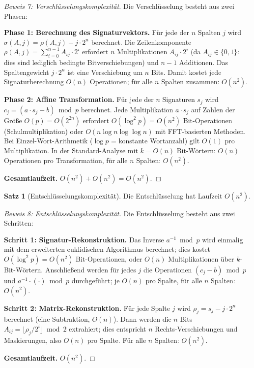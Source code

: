 ﻿\documentclass[a4paper,12pt]{scrreprt}
\theoremstyle{definition}
\newtheorem{satz}{Satz}[section]
\begin{document}
\begin{proof}[Beweis 7: Verschlüsselungskomplexität]
	Die Verschlüsselung besteht aus zwei Phasen:
	
	\textbf{Phase 1: Berechnung des Signaturvektors.}
	Für jede der $n$ Spalten $j$ wird $\sigma(A,j) = \rho(A,j) + j \cdot 2^n$ berechnet. Die Zeilenkomponente $\rho(A,j) = \sum_{i=0}^{n-1} A_{ij} \cdot 2^i$ erfordert $n$ Multiplikationen $A_{ij} \cdot 2^i$ (da $A_{ij} \in \{0,1\}$: dies sind lediglich bedingte Bitverschiebungen) und $n-1$ Additionen. Das Spaltengewicht $j \cdot 2^n$ ist eine Verschiebung um $n$ Bits. Damit kostet jede Signaturberechnung $O(n)$ Operationen; für alle $n$ Spalten zusammen: $O(n^2)$.
	
	\textbf{Phase 2: Affine Transformation.}
	Für jede der $n$ Signaturen $s_j$ wird $c_j = (a \cdot s_j + b) \bmod p$ berechnet. Jede Multiplikation $a \cdot s_j$ auf Zahlen der Größe $O(p) = O(2^{2n})$ erfordert $O(\log^2 p) = O(n^2)$ Bit-Operationen (Schulmultiplikation) oder $O(n \log n \log\log n)$ mit FFT-basierten Methoden. Bei Einzel-Wort-Arithmetik ($\log p$ = konstante Wortanzahl) gilt $O(1)$ pro Multiplikation. In der Standard-Analyse mit $k = O(n)$ Bit-Wörtern: $O(n)$ Operationen pro Transformation, für alle $n$ Spalten: $O(n^2)$.
	
	\textbf{Gesamtlaufzeit.} $O(n^2) + O(n^2) = O(n^2)$.
\end{proof}

\begin{satz}[Entschlüsselungskomplexität]
	\label{satz:dec-kompl}
	Die Entschlüsselung hat Laufzeit $O(n^2)$.
\end{satz}

\begin{proof}[Beweis 8: Entschlüsselungskomplexität]
	Die Entschlüsselung besteht aus zwei Schritten:
	
	\textbf{Schritt 1: Signatur-Rekonstruktion.}
	Das Inverse $a^{-1} \bmod p$ wird einmalig mit dem erweiterten euklidischen Algorithmus berechnet; dies kostet $O(\log^2 p) = O(n^2)$ Bit-Operationen, oder $O(n)$ Multiplikationen über $k$-Bit-Wörtern. Anschließend werden für jedes $j$ die Operationen $(c_j - b) \bmod p$ und $a^{-1} \cdot (\cdot) \bmod p$ durchgeführt; je $O(n)$ pro Spalte, für alle $n$ Spalten: $O(n^2)$.
	
	\textbf{Schritt 2: Matrix-Rekonstruktion.}
	Für jede Spalte $j$ wird $\rho_j = s_j - j \cdot 2^n$ berechnet (eine Subtraktion, $O(n)$). Dann werden die $n$ Bits $A_{ij} = \lfloor \rho_j / 2^i \rfloor \bmod 2$ extrahiert; dies entspricht $n$ Rechts-Verschiebungen und Maskierungen, also $O(n)$ pro Spalte. Für alle $n$ Spalten: $O(n^2)$.
	
	\textbf{Gesamtlaufzeit.} $O(n^2)$.
\end{proof}
\end{document}
